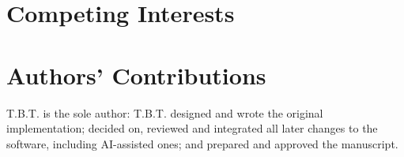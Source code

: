 \documentclass[11pt,a4paper]{article}
\begin{document}
\section*{Competing Interests}

\CompetingText

\section*{Authors' Contributions}

T.B.T. is the sole author: T.B.T. designed and wrote the original implementation; decided on, reviewed and integrated all later changes to the software, including AI-assisted ones; and prepared and approved the manuscript.

\printbibliography[heading=subbibintoc, title={References}]
\end{document}
